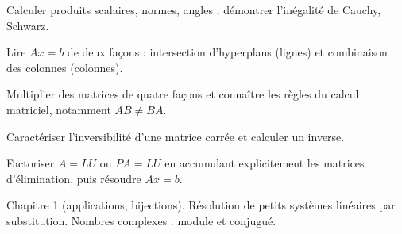 \begin{objectifs}
\item Calculer produits scalaires, normes, angles ; démontrer l'inégalité de Cauchy, Schwarz.
\item Lire $Ax=b$ de deux façons : intersection d'hyperplans (lignes) et combinaison des colonnes (colonnes).
\item Multiplier des matrices de quatre façons et connaître les règles du calcul matriciel, notamment $AB\neq BA$.
\item Caractériser l'inversibilité d'une matrice carrée et calculer un inverse.
\item Factoriser $A=LU$ ou $PA=LU$ en accumulant explicitement les matrices d'élimination, puis résoudre $Ax=b$.
\end{objectifs}
\begin{prerequis}
Chapitre 1 (applications, bijections). Résolution de petits systèmes linéaires par substitution. Nombres complexes : module et conjugué.
\end{prerequis}

